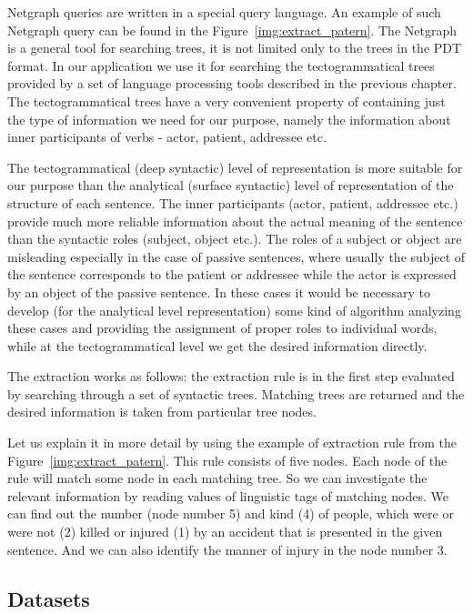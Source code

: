 Netgraph queries are written in a special query language. An example of such Netgraph query can be found in the Figure~\ref{img:extract_patern}. The Netgraph is a general tool for searching trees, it is not limited only to the trees in the PDT format. In our application we use it for searching the tectogrammatical trees provided by a set of language processing tools described in the previous chapter.  The tectogrammatical trees have a very convenient property of containing just the type of information we need for our purpose, namely the information about inner participants of verbs - actor, patient, addressee etc. 

The tectogrammatical (deep syntactic) level of representation is more suitable for our purpose than the analytical (surface syntactic) level of representation of the structure of each sentence. The inner participants (actor, patient, addressee etc.) provide much more reliable information about the actual meaning of the sentence than the syntactic roles (subject, object etc.). The roles of a subject or object are misleading especially in the case of passive sentences, where usually the subject of the sentence corresponds to the patient or addressee while the actor is expressed by an object of the passive sentence. In these cases it would be necessary to develop (for the analytical level representation) some kind of algorithm analyzing these cases and providing the assignment of proper roles to individual words, while at the tectogrammatical level we get the desired information directly.

The extraction works as follows: the extraction rule is in the first step evaluated by searching through a set of syntactic trees. Matching trees are returned and the desired information is taken from particular tree nodes.


Let us explain it in more detail by using the example of extraction rule from the Figure~\ref{img:extract_patern}. This rule consists of five nodes. Each node of the rule will match some node in each matching tree. So we can investigate the relevant information by reading values of linguistic tags of matching nodes. We can find out the number (node number 5) and kind (4) of people, which were or were not (2) killed or injured (1) by an accident that is presented in the given sentence. And we can also identify the manner of injury in the node number 3.


\subsection{Datasets}

